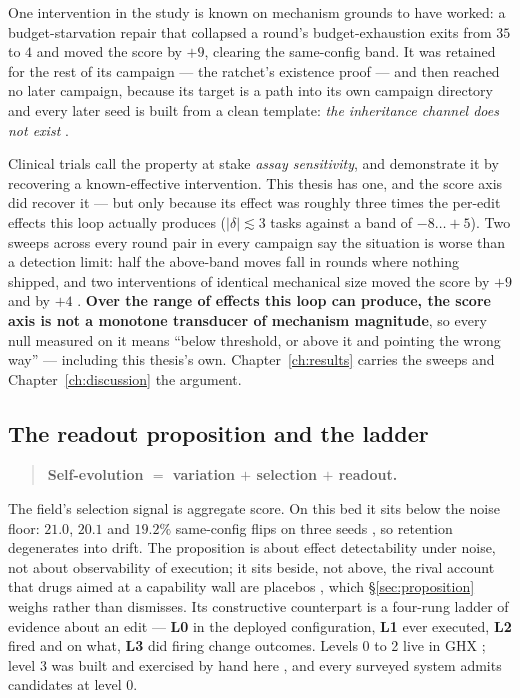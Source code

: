 One intervention in the study is known on mechanism grounds to have
worked: a budget-starvation repair that collapsed a round's
budget-exhaustion exits from $35$ to $4$ and moved the score by $+9$,
clearing the same-config band. It was retained for the rest of its
campaign --- the ratchet's existence proof --- and then reached no later
campaign, because its target is a path into its own campaign directory
and every later seed is built from a clean template: \emph{the
inheritance channel does not exist} .

Clinical trials call the property at stake \emph{assay sensitivity}, and
demonstrate it by recovering a known-effective intervention. This thesis
has one, and the score axis did recover it --- but only because its
effect was roughly three times the per-edit effects this loop actually
produces ($|\delta| \lesssim 3$ tasks against a band of $-8\ldots{+}5$).
Two sweeps across every round pair in every campaign say the situation is
worse than a detection limit: half the above-band moves fall in rounds
where nothing shipped, and two interventions of identical mechanical size
moved the score by $+9$ and by $+4$ . \textbf{Over the range
of effects this loop can produce, the score axis is not a monotone
transducer of mechanism magnitude}, so every null measured on it means
``below threshold, or above it and pointing the wrong way'' --- including
this thesis's own. Chapter~\ref{ch:results} carries the sweeps and
Chapter~\ref{ch:discussion} the argument.

\subsection*{The readout proposition and the ladder}

\begin{quote}
\textbf{Self-evolution $=$ variation $+$ selection $+$ readout.}
\end{quote}

The field's selection signal is aggregate score. On this bed it sits below
the noise floor: $21.0$, $20.1$ and $19.2\%$ same-config flips on three
seeds , so retention degenerates into drift. The
proposition is about effect detectability under noise, not about
observability of execution; it sits beside, not above, the rival account
that drugs aimed at a capability wall are placebos , which
\S\ref{sec:proposition} weighs rather than dismisses. Its constructive
counterpart is a four-rung ladder of evidence about an edit --- \textbf{L0}
in the deployed configuration, \textbf{L1} ever executed, \textbf{L2}
fired and on what, \textbf{L3} did firing change outcomes. Levels 0 to 2
live in GHX ; level 3 was built and exercised by hand here
, and every surveyed system admits candidates at level 0.

